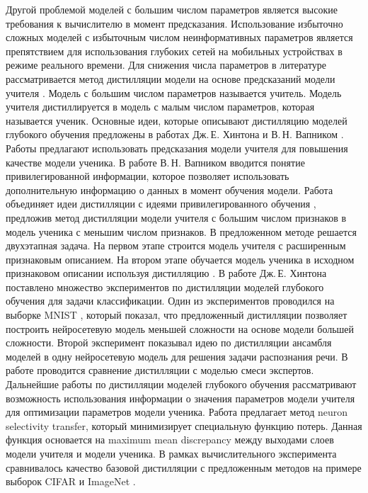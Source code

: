 Другой проблемой моделей с большим числом параметров является высокие требования к вычислителю в момент предсказания. Использование избыточно сложных моделей с избыточным числом неинформативных параметров является препятствием для использования глубоких сетей на мобильных устройствах в режиме реального времени.
Для снижения числа параметров в литературе рассматривается метод дистилляции модели на основе предсказаний модели учителя \cite{Hinton2015, Vapnik2015, Lopez2016}.
Модель с большим числом параметров называется учитель. Модель учителя дистиллируется в модель с малым числом параметров, которая называется ученик.
Основные идеи, которые описывают дистилляцию моделей глубокого обучения предложены в работах Дж.\,Е. Хинтона и В.\,Н. Вапником \cite{Hinton2015, Vapnik2015, Lopez2016}.
Работы предлагают использовать предсказания модели учителя для повышения качестве модели ученика.
В работе \cite{Vapnik2015} В.\,Н. Вапником вводится понятие привилегированной информации, которое позволяет использовать дополнительную информацию о данных в момент обучения модели.
Работа \cite{Lopez2016} объединяет идеи дистилляции \cite{Hinton2015} с идеями привилегированного обучения \cite{Vapnik2015}, предложив метод дистилляции модели учителя с большим числом признаков в модель ученика с меньшим числом признаков.
В предложенном методе \cite{Lopez2016} решается двухэтапная задача. На первом этапе строится модель учителя с расширенным признаковым описанием.
На втором этапе обучается модель ученика в исходном признаковом описании используя дистилляцию \cite{Hinton2015}.
В работе Дж.\,Е. Хинтона \cite{Hinton2015} поставлено множество экспериментов по дистилляции моделей глубокого обучения для задачи классификации.
Один из экспериментов проводился на выборке MNIST \cite{mnist}, который показал, что предложенный дистилляции позволяет построить нейросетевую модель меньшей сложности на основе модели большей сложности.
Второй эксперимент показывал идею по дистилляции ансамбля моделей в одну нейросетевую модель для решения задачи распознания речи. В работе \cite{Hinton2015} проводится сравнение дистилляции с моделью смеси экспертов.
Дальнейшие работы по дистилляции моделей глубокого обучения рассматривают возможность использования информации о значения параметров модели учителя для оптимизации параметров модели ученика. Работа \cite{Zehao2017} предлагает метод neuron selectivity transfer, который минимизирует специальную функцию потерь. Данная функция основается на maximum mean discrepancy между выходами слоев модели учителя и модели ученика. В рамках вычислительного эксперимента сравнивалось качество базовой дистилляции с предложенным методов на примере выборок CIFAR \cite{cifar10} и ImageNet \cite{imagenet}.

